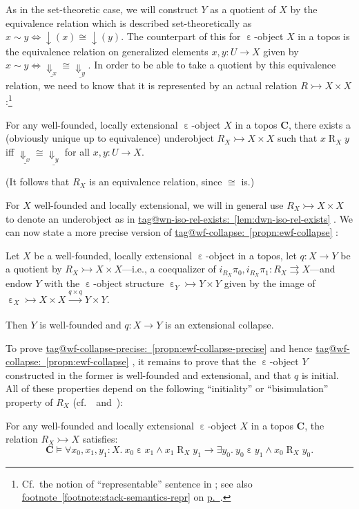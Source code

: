 \documentclass{amsart}
\makeatletter
\newcommand\bC{\mathbf{C}}
\newcommand\dwnfn{{\downarrow}}
\newcommand\Dwn{{\Downarrow}}
\newcommand\ein{\mathrel{\varepsilon}}
\newcommand\Rrel{\mathrel{R}}
\newcommand\toto{\rightrightarrows}
\newcommand\ToT{\Leftrightarrow}
\newcommand\tox[2][]{\xrightarrow[#1]{#2}}
\newcommand\tto{\rightarrowtail}
\newcommand\und[1]{\underline{#1}}
\newcommand\unein{{\ein}}
\newcommand\prooflabel[1]{\gdef\proof@label{#1}}
\def\proof@label{}
\newcommand\tagword[1]{\csname tag@#1\endcsname}
\def\label@tag#1:#2\@nil{#1}
\newcommand\labeltag[1]{\label@tag#1:\@nil}
\newcommand\jref[1]{%
  \texorpdfstring%
    {\hyperref[#1]{\tagword{\labeltag{#1}}~\ref*{#1}}}%
    {\tagword{\labeltag{#1}}~\ref*{#1}}%
}
\newcommand\prerefpost[3]{%
  \texorpdfstring%
    {\hyperref[#2]{#1\ref*{#2}#3}}%
    {#1\ref*{#2}#3}%
}
\newcommand\pref[1]{\hyperref[#1]{p.~\pageref*{#1}}}
\theoremstyle{definition}
\theoremstyle{remark}
\theoremstyle{plainwithref}
\makeatother
\begin{document}
As in the set-theoretic case, we will construct \( Y \) as a quotient of \( X \) by the equivalence relation which is described set-theoretically as \( x \sim y \ToT \dwnfn(x) \cong \dwnfn(y) \).
The counterpart of this for \( \unein \)-object \( X \) in a topos is the equivalence relation on generalized elements \( x,y \colon U \to X \) given by \( x \sim y \ToT \und{\Dwn_x} \cong \und{\Dwn_y} \).
In order to be able to take a quotient by this equivalence relation, we need to know that it is represented by an actual relation \( R \tto X \times X \):\footnote{%
  Cf.\ the notion of ``representable'' sentence in \cite{shulman-stack-semantics}; see also \prerefpost{footnote~}{footnote:stack-semantics-repr}{} on \pref{footnote:stack-semantics-repr}.
}
\prooflabel{proof:dwn-iso-rel-exists}
\begin{lem} \label{lem:dwn-iso-rel-exists}
  For any well-founded, locally extensional \( \unein \)-object \( X \) in a topos \( \bC \), there exists a (obviously unique up to equivalence) underobject \( R_X \tto X \times X \) such that \( x \Rrel_X y \) iff \( \und{\Dwn_x} \cong \und{\Dwn_y} \) for all \( x,y \colon U \to X \).

  \noindent
  (It follows that \( R_X \) is an equivalence relation, since \( {\cong} \) is.)
\end{lem}
For \( X \) well-founded and locally extensional, we will in general use \( R_X \tto X \times X \) to denote an underobject as in \jref{lem:dwn-iso-rel-exists}.
We can now state a more precise version of \jref{propn:ewf-collapse}:
\prooflabel{proof:ewf-collapse-precise}
\begin{propn} \label{propn:ewf-collapse-precise}
  Let \( X \) be a well-founded, locally extensional \( \unein \)-object in a topos, let \( q \colon X \to Y \) be a quotient by \( R_X \tto X \times X \)---i.e., a coequalizer of \( i_{R_X}\pi_0, i_{R_X} \pi_1 \colon R_X \toto X \)---and endow \( Y \) with the \( \unein \)-object structure \( \unein_Y \tto Y \times Y \) given by the image of \( \unein_X \tto X \times X \tox{q \times q} Y \times Y \).

  Then \( Y \) is well-founded and \( q \colon X \to Y \) is an extensional collapse.
\end{propn}

To prove \jref{propn:ewf-collapse-precise} and hence \jref{propn:ewf-collapse}, it remains to prove that the \( \unein \)-object \( Y \) constructed in the former is well-founded and extensional, and that \( q \) is initial.
All of these properties depend on the following ``initiality'' or ``bisimulation'' property of \( R_X \) (cf.\ \cite[\S2]{aczel-non-well-founded-sets}~and~\cite[Lemma~8.28]{shulman-comparing}):
\prooflabel{proof:r-is-bisimulation}
\begin{lem} \label{lem:r-is-bisimulation}
  For any well-founded and locally extensional \( \unein \)-object \( X \) in a topos \( \bC \), the relation \( R_X \tto X \) satisfies:
  \[
    \bC \vDash \forall x_0,x_1,y_1 \colon X.\
    x_0 \ein x_1 \wedge x_1 \Rrel_X y_1 \to \exists y_0.\ y_0 \ein y_1 \wedge x_0 \Rrel_X y_0.
  \]
\end{lem}
\end{document}
